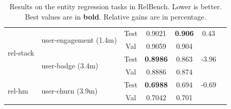 \begin{table}[ht]
\begin{minipage}{.49\textwidth}
{\begin{tabular}{llccccc}
 \midrule
\multirow{4}{*}{rel-stack}
 & \multirow{2}{*}{user-engagement (1.4m)} & Test & 0.9021 & \textbf{0.906} & 0.43 \\
 & & Val & 0.9059 & 0.904 &  \\
 & \multirow{2}{*}{user-badge (3.4m)} & Test & \textbf{0.8986} & 0.863 & -3.96 \\
 & & Val & 0.8886 & 0.874 &  \\

\midrule
\multirow{2}{*}{rel-hm}
 & \multirow{2}{*}{user-churn (3.9m)} & Test & \textbf{0.6988} & 0.694 & -0.69 \\
 & & Val & 0.7042 & 0.701 &  \\

\bottomrule
\end{tabular}
}
\end{minipage}
\hspace{2pt}
\begin{minipage}{.49\textwidth}
\centering
\small
\caption{Results on the entity regression tasks in RelBench. Lower is better. Best values are in \textbf{bold}. Relative gains are in percentage.}
\label{tab:main-results-classification}
\end{minipage}
\end{table}
